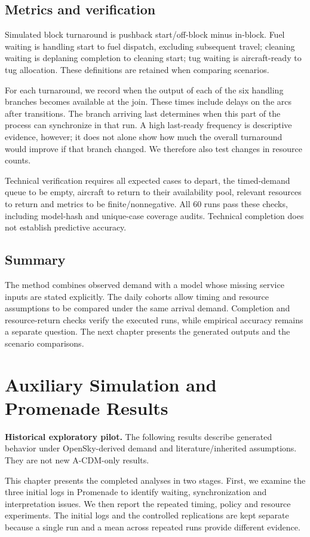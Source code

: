 \section{Metrics and verification}
Simulated block turnaround is pushback start/off-block minus in-block. Fuel waiting is handling start to fuel dispatch, excluding subsequent travel; cleaning waiting is deplaning completion to cleaning start; tug waiting is aircraft-ready to tug allocation. These definitions are retained when comparing scenarios.

For each turnaround, we record when the output of each of the six handling branches becomes available at the join. These times include delays on the arcs after transitions. The branch arriving last determines when this part of the process can synchronize in that run. A high last-ready frequency is descriptive evidence, however; it does not alone show how much the overall turnaround would improve if that branch changed. We therefore also test changes in resource counts.

Technical verification requires all expected cases to depart, the timed-demand queue to be empty, aircraft to return to their availability pool, relevant resources to return and metrics to be finite/nonnegative. All 60 runs pass these checks, including model-hash and unique-case coverage audits. Technical completion does not establish predictive accuracy.


\section{Summary}
The method combines observed demand with a model whose missing service inputs are stated explicitly. The daily cohorts allow timing and resource assumptions to be compared under the same arrival demand. Completion and resource-return checks verify the executed runs, while empirical accuracy remains a separate question. The next chapter presents the generated outputs and the scenario comparisons.


\chapter{Auxiliary Simulation and Promenade Results}
\label{app:auxresults}
\noindent\textbf{Historical exploratory pilot.} The following results describe generated behavior under OpenSky-derived demand and literature/inherited assumptions. They are not new A-CDM-only results.

This chapter presents the completed analyses in two stages. First, we examine the three initial logs in Promenade to identify waiting, synchronization and interpretation issues. We then report the repeated timing, policy and resource experiments. The initial logs and the controlled replications are kept separate because a single run and a mean across repeated runs provide different evidence.

